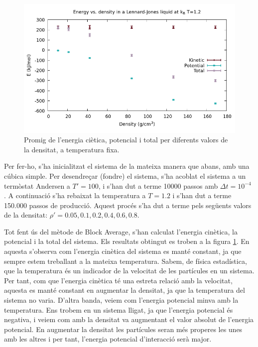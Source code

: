 \documentclass[a4paper,10pt]{article}
\begin{document}
\begin{figure}
	\centering
	\includegraphics[width=\linewidth]{pot_energy_density}
	\caption{Promig de l'energia ciètica, potencial i total per diferents valors de la densitat, a temperatura fixa.}
	\label{fig:energyvsrho}
\end{figure}

Per fer-ho, s'ha inicialitzat el sistema de la mateixa manera que abans, amb una cúbica simple. Per desendreçar (fondre) el sistema, s'ha acoblat el sistema a un termòstat Andersen a $T' = 100$, i s'han dut a terme 10000 passos amb $\Delta t = 10^{-4}$ . A continuació s'ha rebaixat la temperatura a $T=1.2$ i s'han dut a terme 150.000 passos de producció. Aquest procés s'ha dut a terme pels següents valors de la densitat: $\rho' = 0.05, 0.1, 0.2, 0.4, 0.6, 0.8 $.


Tot fent ús del mètode de Block Average, s'han calculat l'energia cinètica, la potencial i la total del sistema. Els resultats obtingut es troben a la figura \ref{fig:energyvsrho}. En aquesta s'observa com l'energia cinètica del sistema es manté constant, ja que sempre estem treballant a la mateixa temperatura. Sabem, de física estadística, que la temperatura és un indicador de la velocitat de les partícules en un sistema. Per tant, com que l'energia cinètica té una estreta relació amb la velocitat, aquesta es manté constant en augmentar la densitat, ja que la temperatura del sistema no varia. D'altra banda, veiem com l'energia potencial minva amb la temperatura. Ens trobem en un sistema lligat, ja que l'energia potencial és negativa, i veiem com amb la densitat va augmentant el valor absolut de l'energia potencial. En augmentar la densitat les partícules seran més properes les unes amb les altres i per tant, l'energia potencial d'interacció serà major. 
\end{document}
